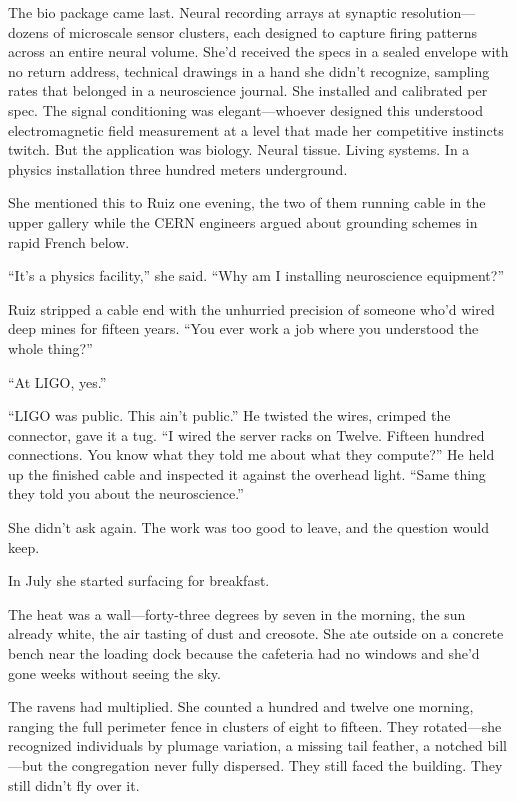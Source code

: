 The bio package came last. Neural recording arrays at synaptic resolution---dozens of microscale sensor clusters, each designed to capture firing patterns across an entire neural volume. She'd received the specs in a sealed envelope with no return address, technical drawings in a hand she didn't recognize, sampling rates that belonged in a neuroscience journal. She installed and calibrated per spec. The signal conditioning was elegant---whoever designed this understood electromagnetic field measurement at a level that made her competitive instincts twitch. But the application was biology. Neural tissue. Living systems. In a physics installation three hundred meters underground.

She mentioned this to Ruiz one evening, the two of them running cable in the upper gallery while the CERN engineers argued about grounding schemes in rapid French below.

``It's a physics facility,'' she said. ``Why am I installing neuroscience equipment?''

Ruiz stripped a cable end with the unhurried precision of someone who'd wired deep mines for fifteen years. ``You ever work a job where you understood the whole thing?''

``At LIGO, yes.''

``LIGO was public. This ain't public.'' He twisted the wires, crimped the connector, gave it a tug. ``I wired the server racks on Twelve. Fifteen hundred connections. You know what they told me about what they compute?'' He held up the finished cable and inspected it against the overhead light. ``Same thing they told you about the neuroscience.''

She didn't ask again. The work was too good to leave, and the question would keep.

\scenebreak

In July she started surfacing for breakfast.

The heat was a wall---forty-three degrees by seven in the morning, the sun already white, the air tasting of dust and creosote. She ate outside on a concrete bench near the loading dock because the cafeteria had no windows and she'd gone weeks without seeing the sky.

The ravens had multiplied. She counted a hundred and twelve one morning, ranging the full perimeter fence in clusters of eight to fifteen. They rotated---she recognized individuals by plumage variation, a missing tail feather, a notched bill---but the congregation never fully dispersed. They still faced the building. They still didn't fly over it.

